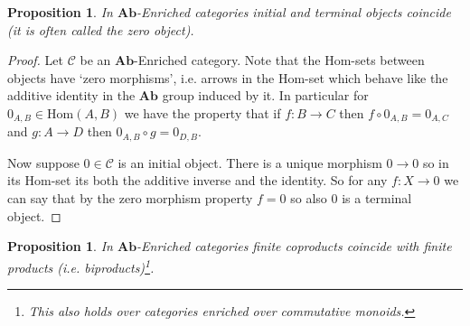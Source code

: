 \documentclass[12pt]{report}
\numberwithin{equation}{section}
\newcommand{\Hom}{{\mathrm{Hom}}}
\newtheorem{proposition}[dummy]{Proposition}
\begin{document}
	
	\begin{proposition}
		In $\mathbf{Ab}$-Enriched categories initial and terminal objects coincide (it is often called the zero object).
	\end{proposition}
	\begin{proof}
		Let $\mathcal{C}$ be an $\mathbf{Ab}$-Enriched category. Note that the Hom-sets between objects have `zero morphisms', i.e. arrows in the Hom-set which behave like the additive identity in the $\mathbf{Ab}$ group induced by it. In particular for $0_{A,B}\in \Hom(A,B)$ we have the property that if $f:B \to C$ then $f\circ 0_{A,B}=0_{A,C}$ and $g: A \to D$ then $0_{A,B}\circ g=0_{D,B}$.
		
		Now suppose $0 \in \mathcal{C}$ is an initial object. There is a unique morphism $0\to 0$ so in its Hom-set its both the additive inverse and the identity. So for any $f:X \to 0$ we can say that by the zero morphism property $f=0$ so also $0$ is a terminal object.
	\end{proof}
	\begin{proposition}
		In $\mathbf{Ab}$-Enriched categories finite coproducts coincide with finite products (i.e. biproducts)\footnote{This also holds over categories enriched over commutative monoids.}.
	\end{proposition}
\end{document}
